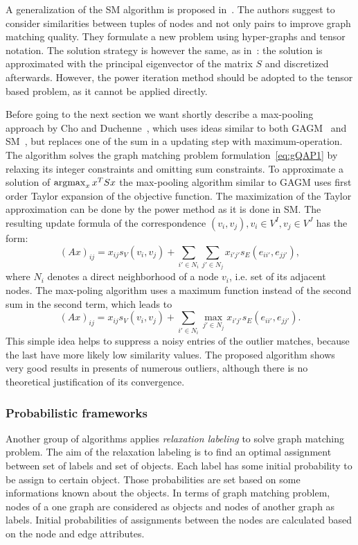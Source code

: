 A generalization of the SM algorithm is proposed in~\cite{Duchenne2011}. The authors suggest to consider similarities between tuples of nodes and not only pairs to improve graph matching quality. They formulate a new problem using hyper-graphs and tensor notation. The solution strategy is however the same, as in~\cite{Leordeanu2005_SM}: the solution is approximated with the principal eigenvector of the matrix $S$ and discretized afterwards. However, the power iteration method should be adopted to the tensor based problem, as it cannot be applied directly.

Before going to the next section we want shortly describe a max-pooling approach by Cho and Duchenne~\cite{Cho2014_Haystack}, which uses ideas similar to both GAGM~\cite{Rangarajan1996_GAGM} and SM~\cite{Leordeanu2005_SM}, but replaces one of the sum in a updating step with maximum-operation. The algorithm solves the graph matching problem formulation~\eqref{eq:gQAP1} by relaxing its integer constraints and omitting sum constraints. To approximate a solution of $\mathop{\rm argmax}_{x}x^TSx$ the max-pooling algorithm similar to GAGM uses first order Taylor expansion of the objective function. The maximization of the Taylor approximation can be done by the power method as it is done in SM.
The resulting update formula of the correspondence $(v_i,v_j),v_i\in V^I,v_j\in V^J$ has the form:
\begin{equation}
(Ax)_{ij}=x_{ij}s_V(v_i,v_{j})+\sum_{i'\in N_i}\sum_{j'\in N_j}x_{i'j'}s_E(e_{ii'},e_{jj'}),
\end{equation}
where $N_i$ denotes a direct neighborhood of a node $v_i$, i.e. set of its adjacent nodes.
The max-poling algorithm uses a maximum function instead of the second sum in the second term, which leads to
\begin{equation}
(Ax)_{ij}=x_{ij}s_V(v_i,v_{j})+\sum_{i'\in N_i}\max_{j'\in N_j}x_{i'j'}s_E(e_{ii'},e_{jj'}).
\end{equation}
This simple idea helps to suppress a noisy entries of the outlier matches, because the last have more likely low similarity values. The proposed algorithm shows very good results in presents of numerous outliers, although there is no theoretical justification of its convergence.
\subsubsection{Probabilistic frameworks}
Another group of algorithms applies \emph{relaxation labeling} to solve graph matching problem. The aim of the relaxation labeling is to find an optimal assignment between set of labels and set of objects. Each label has some initial probability to be assign to certain object. Those probabilities are set based on some informations known about the objects. In terms of graph matching problem, nodes of a one graph are considered as objects and nodes of another graph as labels. Initial probabilities of assignments between the nodes are calculated  based on the node and edge attributes. 


